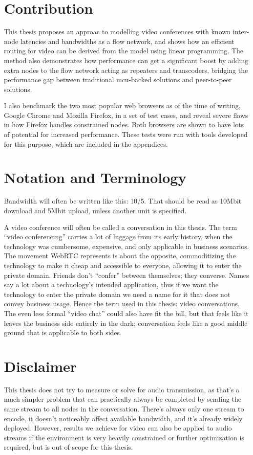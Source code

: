 \section{Contribution}

This thesis proposes an approac to modelling video conferences with known inter-node latencies and bandwidths as a flow network, and shows how an efficient routing for video can be derived from the model using linear programming. The method also demonstrates how performance can get a significant boost by adding extra nodes to the flow network acting as repeaters and transcoders, bridging the performance gap between traditional \gls{mcu}-backed solutions and peer-to-peer solutions.

I also benchmark the two most popular web browsers as of the time of writing, Google Chrome and Mozilla Firefox, in a set of test cases, and reveal severe flaws in how Firefox handles constrained nodes. Both browsers are shown to have lots of potential for increased performance. These tests were run with tools developed for this purpose, which are included in the appendices.


\section{Notation and Terminology}

Bandwidth will often be written like this: 10/5. That should be read as 10Mbit download and 5Mbit upload, unless another unit is specified.

A video conference will often be called a conversation in this thesis. The term ``video conferencing'' carries a lot of luggage from its early history, when the technology was cumbersome, expensive, and only applicable in business scenarios. The movement WebRTC represents is about the opposite, commoditizing the technology to make it cheap and accessible to everyone, allowing it to enter the private domain. Friends don't ``confer'' between themselves; they converse. Names say a lot about a technology's intended application, thus if we want the technology to enter the private domain we need a name for it that does not convey business usage. Hence the term used in this thesis: video conversations. The even less formal ``video chat'' could also have fit the bill, but that feels like it leaves the business side entirely in the dark; conversation feels like a good middle ground that is applicable to both sides.


\section{Disclaimer}

This thesis does not try to measure or solve for audio transmission, as that's a much simpler problem that can practically always be completed by sending the same stream to all nodes in the conversation. There's always only one stream to encode, it doesn't noticeably affect available bandwidth, and it's already widely deployed. However, results we achieve for video can also be applied to audio streams if the environment is very heavily constrained or further optimization is required, but is out of scope for this thesis.
